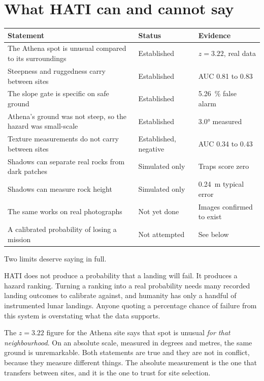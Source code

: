 \documentclass[11pt]{article}
\begin{document}
\section{What HATI can and cannot say}
\label{sec:cannot}

\begin{center}
\small
\begin{tabular}{p{8.2cm} l p{3.4cm}}
\toprule
Statement & Status & Evidence \\
\midrule
The Athena spot is unusual compared to its surroundings & Established & $z = 3.22$, real data \\
Steepness and ruggedness carry between sites & Established & AUC \num{0.81} to \num{0.83} \\
The slope gate is specific on safe ground & Established & \SI{5.26}{\percent} false alarm \\
Athena's ground was not steep, so the hazard was small-scale & Established & \ang{3.0} measured \\
Texture measurements do not carry between sites & Established, negative & AUC \num{0.34} to \num{0.43} \\
Shadows can separate real rocks from dark patches & Simulated only & Traps score zero \\
Shadows can measure rock height & Simulated only & \SI{0.24}{\meter} typical error \\
The same works on real photographs & Not yet done & Images confirmed to exist \\
A calibrated probability of losing a mission & Not attempted & See below \\
\bottomrule
\end{tabular}
\end{center}

Two limits deserve saying in full.

HATI does not produce a probability that a landing will fail. It produces a hazard
ranking. Turning a ranking into a real probability needs many recorded landing
outcomes to calibrate against, and humanity has only a handful of instrumented lunar
landings. Anyone quoting a percentage chance of failure from this system is
overstating what the data supports.

The $z = 3.22$ figure for the Athena site says that spot is unusual \emph{for that
neighbourhood}. On an absolute scale, measured in degrees and metres, the same ground
is unremarkable. Both statements are true and they are not in conflict, because they
measure different things. The absolute measurement is the one that transfers between
sites, and it is the one to trust for site selection.
\end{document}
